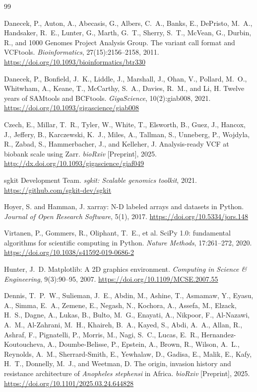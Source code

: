 \documentclass{article}
\begin{document}
\begin{thebibliography}{99}

Danecek, P., Auton, A., Abecasis, G., Albers, C.~A., Banks, E., DePristo, M.~A., Handsaker, R.~E., Lunter, G., Marth, G.~T., Sherry, S.~T., McVean, G., Durbin, R., and 1000 Genomes Project Analysis Group.
The variant call format and VCFtools.
\textit{Bioinformatics}, 27(15):2156--2158, 2011.
\url{https://doi.org/10.1093/bioinformatics/btr330}

Danecek, P., Bonfield, J.~K., Liddle, J., Marshall, J., Ohan, V., Pollard, M.~O., Whitwham, A., Keane, T., McCarthy, S.~A., Davies, R.~M., and Li, H.
Twelve years of SAMtools and BCFtools.
\textit{GigaScience}, 10(2):giab008, 2021.
\url{https://doi.org/10.1093/gigascience/giab008}

Czech, E., Millar, T.~R., Tyler, W., White, T., Elsworth, B., Guez, J., Hancox, J., Jeffery, B., Karczewski, K.~J., Miles, A., Tallman, S., Unneberg, P., Wojdyla, R., Zabad, S., Hammerbacher, J., and Kelleher, J.
Analysis-ready VCF at biobank scale using Zarr.
\textit{bioRxiv} [Preprint], 2025.
\url{http://dx.doi.org/10.1093/gigascience/giaf049}

sgkit Development Team.
\textit{sgkit: Scalable genomics toolkit}, 2021.
\url{https://github.com/sgkit-dev/sgkit}

Hoyer, S. and Hamman, J.
xarray: N-D labeled arrays and datasets in Python.
\textit{Journal of Open Research Software}, 5(1), 2017.
\url{https://doi.org/10.5334/jors.148}

Virtanen, P., Gommers, R., Oliphant, T.~E., et al.
{SciPy} 1.0: fundamental algorithms for scientific computing in Python.
\textit{Nature Methods}, 17:261--272, 2020.
\url{https://doi.org/10.1038/s41592-019-0686-2}

Hunter, J.~D.
Matplotlib: A 2D graphics environment.
\textit{Computing in Science \& Engineering}, 9(3):90--95, 2007.
\url{https://doi.org/10.1109/MCSE.2007.55}

Dennis, T.~P.~W., Sulieman, J.~E., Abdin, M., Ashine, T., Asmamaw, Y., Eyasu, A., Simma, E.~A., Zemene, E., Negash, N., Kochora, A., Assefa, M., Elzack, H.~S., Dagne, A., Lukas, B., Bulto, M.~G., Enayati, A., Nikpoor, F., Al-Nazawi, A.~M., Al-Zahrani, M.~H., Khaireh, B.~A., Kayed, S., Abdi, A.~A., Allan, R., Ashraf, F., Pignatelli, P., Morris, M., Nagi, S.~C., Lucas, E.~R., Hernandez-Koutoucheva, A., Doumbe-Belisse, P., Epstein, A., Brown, R., Wilson, A.~L., Reynolds, A.~M., Sherrard-Smith, E., Yewhalaw, D., Gadisa, E., Malik, E., Kafy, H.~T., Donnelly, M.~J., and Weetman, D.
The origin, invasion history and resistance architecture of \textit{Anopheles stephensi} in Africa.
\textit{bioRxiv} [Preprint], 2025.
\url{https://doi.org/10.1101/2025.03.24.644828}

\end{thebibliography}
\end{document}
